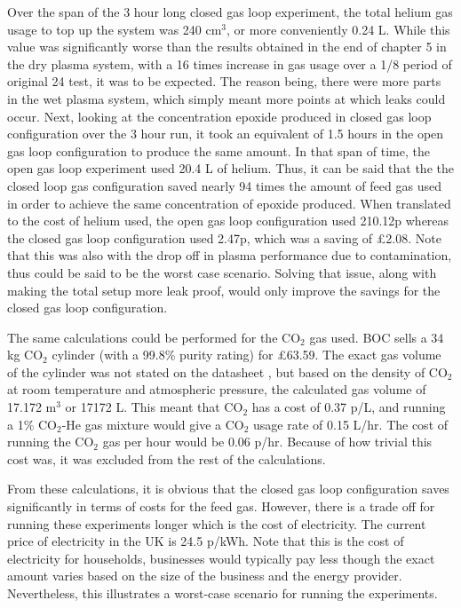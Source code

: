 Over the span of the 3 hour long closed gas loop experiment, the total helium gas usage to top up the system was 240 cm$^3$, or more conveniently 0.24 L. While this value was significantly worse than the results obtained in the end of chapter 5 in the dry plasma system, with a 16 times increase in gas usage over a 1/8 period of original 24 test, it was to be expected. The reason being, there were more parts in the wet plasma system, which simply meant more points at which leaks could occur. Next, looking at the concentration epoxide produced in closed gas loop configuration over the 3 hour run, it took an equivalent of 1.5 hours in the open gas loop configuration to produce the same amount. In that span of time, the open gas loop experiment used 20.4 L of helium. Thus, it can be said that the the closed loop gas configuration saved nearly 94 times the amount of feed gas used in order to achieve the same concentration of epoxide produced. When translated to the cost of helium used, the open gas loop configuration used 210.12p whereas the closed gas loop configuration used 2.47p, which was a saving of £2.08. Note that this was also with the drop off in plasma performance due to contamination, thus could be said to be the worst case scenario. Solving that issue, along with making the total setup more leak proof, would only improve the savings for the closed gas loop configuration.   

The same calculations could be performed for the CO$_2$ gas used. BOC sells a 34 kg CO$_2$ cylinder (with a 99.8\% purity rating) for £63.59. The exact gas volume of the cylinder was not stated on the datasheet \cite{bocCO2DS}, but based on the density of CO$_2$ at room temperature and atmospheric pressure, the calculated gas volume of 17.172 m$^3$ or 17172 L. This meant that CO$_2$ has a cost of 0.37 p/L, and running a 1\% CO$_2$-He gas mixture would give a CO$_2$ usage rate of 0.15 L/hr. The cost of running the CO$_2$ gas per hour would be 0.06 p/hr. Because of how trivial this cost was, it was excluded from the rest of the calculations.

From these calculations, it is obvious that the closed gas loop configuration saves significantly in terms of costs for the feed gas. However, there is a trade off for running these experiments longer which is the cost of electricity. The current price of electricity in the UK is 24.5 p/kWh. Note that this is the cost of electricity for households, businesses would typically pay less though the exact amount varies based on the size of the business and the energy provider. Nevertheless, this illustrates a worst-case scenario for running the experiments. 


